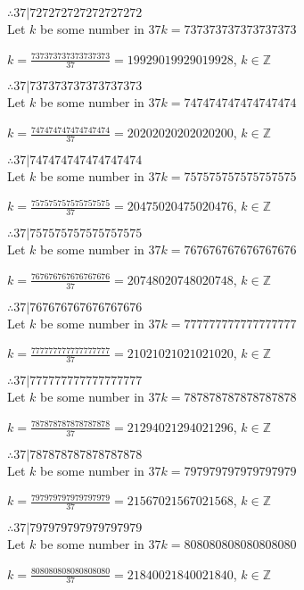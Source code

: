\documentclass{article}
\begin{document}
$ \therefore  37|727272727272727272 $ \\

Let $k$ be some number in $37k = 737373737373737373$

$k = \frac{737373737373737373}{37} = 19929019929019928$, $k \in \mathbb{Z}$

$ \therefore  37|737373737373737373 $ \\

Let $k$ be some number in $37k = 747474747474747474$

$k = \frac{747474747474747474}{37} = 20202020202020200$, $k \in \mathbb{Z}$

$ \therefore  37|747474747474747474 $ \\

Let $k$ be some number in $37k = 757575757575757575$

$k = \frac{757575757575757575}{37} = 20475020475020476$, $k \in \mathbb{Z}$

$ \therefore  37|757575757575757575 $ \\

Let $k$ be some number in $37k = 767676767676767676$

$k = \frac{767676767676767676}{37} = 20748020748020748$, $k \in \mathbb{Z}$

$ \therefore  37|767676767676767676 $ \\

Let $k$ be some number in $37k = 777777777777777777$

$k = \frac{777777777777777777}{37} = 21021021021021020$, $k \in \mathbb{Z}$

$ \therefore  37|777777777777777777 $ \\

Let $k$ be some number in $37k = 787878787878787878$

$k = \frac{787878787878787878}{37} = 21294021294021296$, $k \in \mathbb{Z}$

$ \therefore  37|787878787878787878 $ \\

Let $k$ be some number in $37k = 797979797979797979$

$k = \frac{797979797979797979}{37} = 21567021567021568$, $k \in \mathbb{Z}$

$ \therefore  37|797979797979797979 $ \\

Let $k$ be some number in $37k = 808080808080808080$

$k = \frac{808080808080808080}{37} = 21840021840021840$, $k \in \mathbb{Z}$
\end{document}
